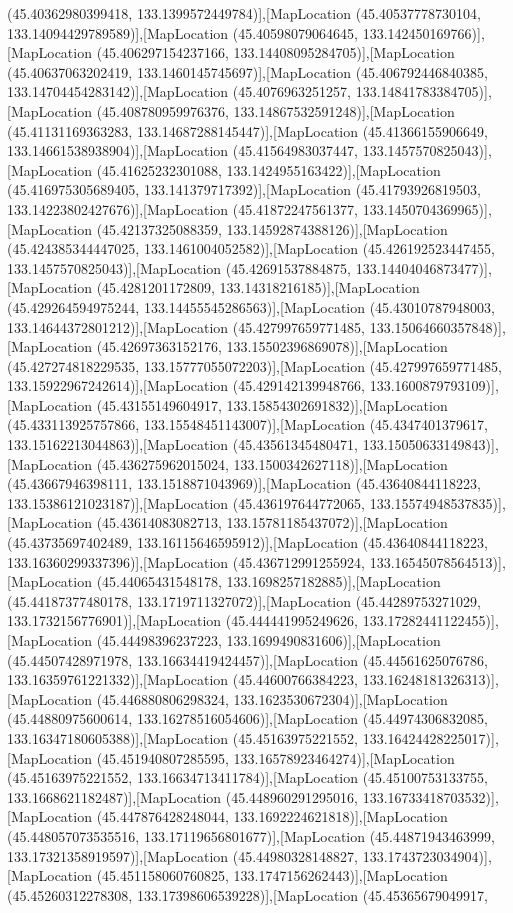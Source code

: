 (45.40362980399418, 133.1399572449784)],[MapLocation (45.40537778730104, 133.14094429789589)],[MapLocation (45.40598079064645, 133.142450169766)],[MapLocation (45.406297154237166, 133.14408095284705)],[MapLocation (45.40637063202419, 133.1460145745697)],[MapLocation (45.406792446840385, 133.14704454283142)],[MapLocation (45.4076963251257, 133.14841783384705)],[MapLocation (45.408780959976376, 133.14867532591248)],[MapLocation (45.41131169363283, 133.14687288145447)],[MapLocation (45.41366155906649, 133.14661538938904)],[MapLocation (45.41564983037447, 133.1457570825043)],[MapLocation (45.41625232301088, 133.1424955163422)],[MapLocation (45.416975305689405, 133.141379717392)],[MapLocation (45.41793926819503, 133.14223802427676)],[MapLocation (45.41872247561377, 133.1450704369965)],[MapLocation (45.42137325088359, 133.14592874388126)],[MapLocation (45.424385344447025, 133.1461004052582)],[MapLocation (45.426192523447455, 133.1457570825043)],[MapLocation (45.42691537884875, 133.14404046873477)],[MapLocation (45.4281201172809, 133.14318216185)],[MapLocation (45.429264594975244, 133.14455545286563)],[MapLocation (45.43010787948003, 133.14644372801212)],[MapLocation (45.427997659771485, 133.15064660357848)],[MapLocation (45.42697363152176, 133.15502396869078)],[MapLocation (45.427274818229535, 133.15777055072203)],[MapLocation (45.427997659771485, 133.15922967242614)],[MapLocation (45.429142139948766, 133.1600879793109)],[MapLocation (45.43155149604917, 133.15854302691832)],[MapLocation (45.433113925757866, 133.15548451143007)],[MapLocation (45.4347401379617, 133.15162213044863)],[MapLocation (45.43561345480471, 133.15050633149843)],[MapLocation (45.436275962015024, 133.1500342627118)],[MapLocation (45.43667946398111, 133.1518871043969)],[MapLocation (45.43640844118223, 133.15386121023187)],[MapLocation (45.436197644772065, 133.15574948537835)],[MapLocation (45.43614083082713, 133.15781185437072)],[MapLocation (45.43735697402489, 133.16115646595912)],[MapLocation (45.43640844118223, 133.16360299337396)],[MapLocation (45.436712991255924, 133.16545078564513)],[MapLocation (45.44065431548178, 133.1698257182885)],[MapLocation (45.44187377480178, 133.1719711327072)],[MapLocation (45.44289753271029, 133.1732156776901)],[MapLocation (45.444441995249626, 133.17282441122455)],[MapLocation (45.44498396237223, 133.1699490831606)],[MapLocation (45.44507428971978, 133.16634419424457)],[MapLocation (45.44561625076786, 133.16359761221332)],[MapLocation (45.44600766384223, 133.16248181326313)],[MapLocation (45.446880806298324, 133.1623530672304)],[MapLocation (45.44880975600614, 133.16278516054606)],[MapLocation (45.44974306832085, 133.16347180605388)],[MapLocation (45.45163975221552, 133.16424428225017)],[MapLocation (45.451940807285595, 133.16578923464274)],[MapLocation (45.45163975221552, 133.16634713411784)],[MapLocation (45.45100753133755, 133.1668621182487)],[MapLocation (45.448960291295016, 133.16733418703532)],[MapLocation (45.447876428248044, 133.1692224621818)],[MapLocation (45.448057073535516, 133.17119656801677)],[MapLocation (45.44871943463999, 133.17321358919597)],[MapLocation (45.44980328148827, 133.1743723034904)],[MapLocation (45.451158060760825, 133.1747156262443)],[MapLocation (45.45260312278308, 133.17398606539228)],[MapLocation (45.45365679049917, 